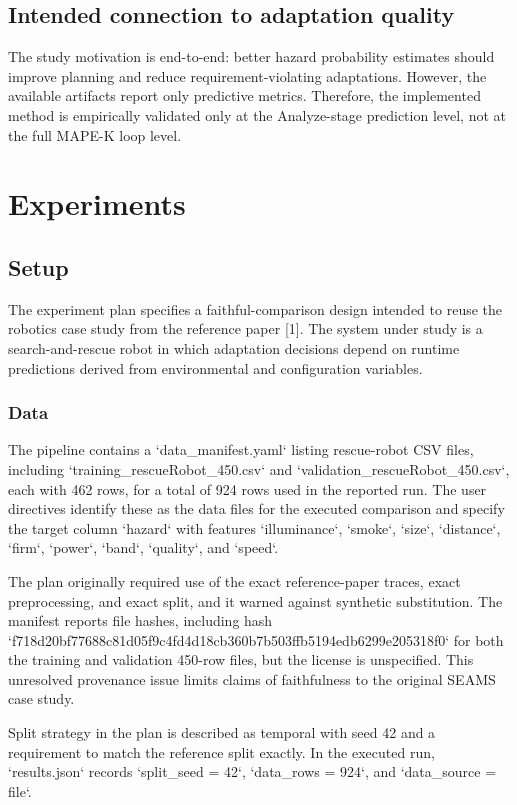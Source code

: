 \documentclass[11pt,a4paper]{article}
\begin{document}
\subsection{Intended connection to adaptation quality}
The study motivation is end-to-end: better hazard probability estimates should improve planning and reduce requirement-violating adaptations. However, the available artifacts report only predictive metrics. Therefore, the implemented method is empirically validated only at the Analyze-stage prediction level, not at the full MAPE-K loop level.


\section{Experiments}

\subsection{Setup}
The experiment plan specifies a faithful-comparison design intended to reuse the robotics case study from the reference paper [1]. The system under study is a search-and-rescue robot in which adaptation decisions depend on runtime predictions derived from environmental and configuration variables.


\subsubsection{Data}
The pipeline contains a `data\_manifest.yaml` listing rescue-robot CSV files, including `training\_rescueRobot\_450.csv` and `validation\_rescueRobot\_450.csv`, each with 462 rows, for a total of 924 rows used in the reported run. The user directives identify these as the data files for the executed comparison and specify the target column `hazard` with features `illuminance`, `smoke`, `size`, `distance`, `firm`, `power`, `band`, `quality`, and `speed`.

The plan originally required use of the exact reference-paper traces, exact preprocessing, and exact split, and it warned against synthetic substitution. The manifest reports file hashes, including hash `f718d20bf77688c81d05f9c4fd4d18cb360b7b503ffb5194edb6299e205318f0` for both the training and validation 450-row files, but the license is unspecified. This unresolved provenance issue limits claims of faithfulness to the original SEAMS case study.

Split strategy in the plan is described as temporal with seed 42 and a requirement to match the reference split exactly. In the executed run, `results.json` records `split\_seed = 42`, `data\_rows = 924`, and `data\_source = file`.
\end{document}

